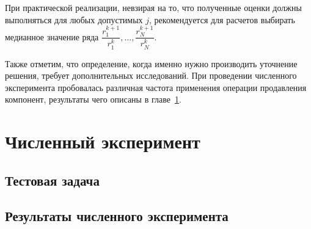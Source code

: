 \documentclass[a4paper,14pt]{extreport}
\begin{document}
При практической реализации, невзирая на то, что полученные оценки должны выполняться для любых допустимых $j$, рекомендуется для расчетов выбирать медианное значение ряда $\dfrac{r_1^{k+1}}{r_1^k}, \ldots, \dfrac{r_N^{k+1}}{r_N^k}$.

Также отметим, что определение, когда именно нужно производить уточнение решения, требует дополнительных исследований. При проведении численного эксперимента пробовалась различная частота применения операции продавления компонент, результаты чего описаны в главе~\ref{c:numer_ex}.
  
  
  \chapter{Численный эксперимент}
  \label{c:numer_ex}
  
  \section{Тестовая задача}
  \label{s:test_problem}
  
  \section{Результаты численного эксперимента}
  \label{s:results}
  
  
\newpage
\end{document}

